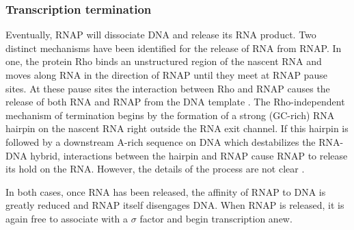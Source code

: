 \subsubsection{Transcription termination}
Eventually, RNAP will dissociate DNA and release its RNA product. Two distinct
mechanisms have been identified for the release of RNA from RNAP. In one, the
protein Rho binds an unstructured region of the nascent RNA and moves along RNA
in the direction of RNAP until they meet at RNAP pause sites. At these pause
sites the interaction between Rho and RNAP causes the release of both RNA and
RNAP from the DNA template \cite{ciampi_rho-dependent_2006}. The
Rho-independent mechanism of termination begins by the formation of a strong
(GC-rich) RNA hairpin on the nascent RNA right outside the RNA exit channel. If
this hairpin is followed by a downstream A-rich sequence on DNA which
destabilizes the RNA-DNA hybrid, interactions between the hairpin and RNAP
cause RNAP to release its hold on the RNA. However, the details of the process
are not clear \cite{nudler_transcription_2002}.

In both cases, once RNA has been released, the affinity of RNAP to DNA is
greatly reduced and RNAP itself disengages DNA. When RNAP is released, it is
again free to associate with a $\sigma$ factor and begin transcription anew.

